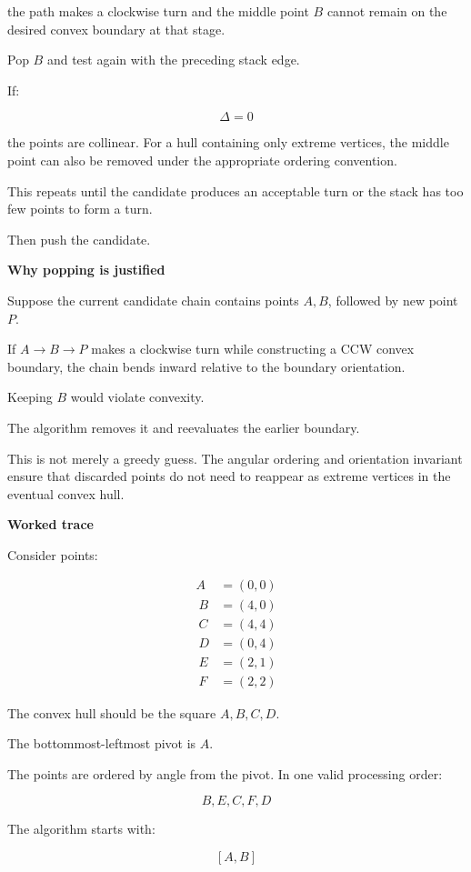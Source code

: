 the path makes a clockwise turn and the middle point \(B\) cannot remain on the desired convex boundary at that stage.

Pop \(B\) and test again with the preceding stack edge.

If:

\[
\Delta=0
\]

the points are collinear. For a hull containing only extreme vertices, the middle point can also be removed under the appropriate ordering convention.

This repeats until the candidate produces an acceptable turn or the stack has too few points to form a turn.

Then push the candidate.

\textbf{Why popping is justified}

Suppose the current candidate chain contains points \(A,B\), followed by new point \(P\).

If \(A\rightarrow B\rightarrow P\) makes a clockwise turn while constructing a CCW convex boundary, the chain bends inward relative to the boundary orientation.

Keeping \(B\) would violate convexity.

The algorithm removes it and reevaluates the earlier boundary.

This is not merely a greedy guess. The angular ordering and orientation invariant ensure that discarded points do not need to reappear as extreme vertices in the eventual convex hull.

\textbf{Worked trace}

Consider points:

\[
\begin{aligned} A&=(0,0)\\\ B&=(4,0)\\\ C&=(4,4)\\\ D&=(0,4)\\\ E&=(2,1)\\\ F&=(2,2) \end{aligned}
\]

The convex hull should be the square \(A,B,C,D\).

The bottommost-leftmost pivot is \(A\).

The points are ordered by angle from the pivot. In one valid processing order:

\[
B,E,C,F,D
\]

The algorithm starts with:

\[
[A,B]
\]

